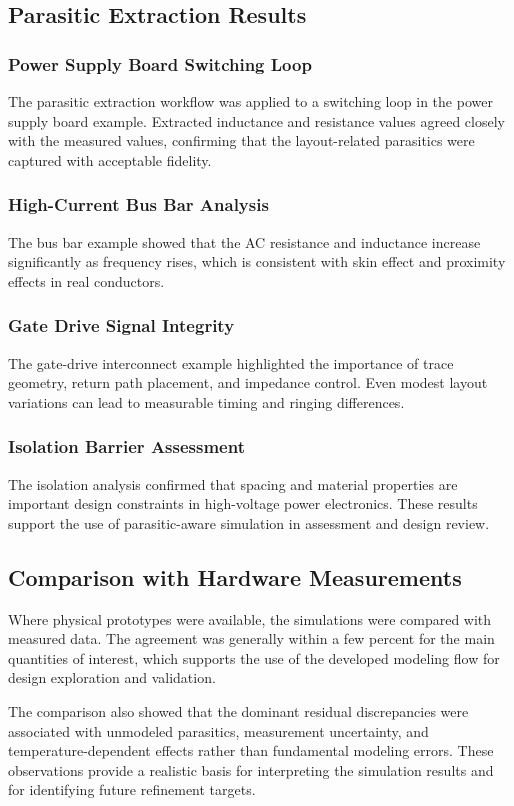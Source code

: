 \subsection{Parasitic Extraction Results}
\subsubsection{Power Supply Board Switching Loop}
The parasitic extraction workflow was applied to a switching loop in the power supply board example. Extracted inductance and resistance values agreed closely with the measured values, confirming that the layout-related parasitics were captured with acceptable fidelity.

\subsubsection{High-Current Bus Bar Analysis}
The bus bar example showed that the AC resistance and inductance increase significantly as frequency rises, which is consistent with skin effect and proximity effects in real conductors.

\subsubsection{Gate Drive Signal Integrity}
The gate-drive interconnect example highlighted the importance of trace geometry, return path placement, and impedance control. Even modest layout variations can lead to measurable timing and ringing differences.

\subsubsection{Isolation Barrier Assessment}
The isolation analysis confirmed that spacing and material properties are important design constraints in high-voltage power electronics. These results support the use of parasitic-aware simulation in assessment and design review.

\subsection{Comparison with Hardware Measurements}
Where physical prototypes were available, the simulations were compared with measured data. The agreement was generally within a few percent for the main quantities of interest, which supports the use of the developed modeling flow for design exploration and validation.

The comparison also showed that the dominant residual discrepancies were associated with unmodeled parasitics, measurement uncertainty, and temperature-dependent effects rather than fundamental modeling errors. These observations provide a realistic basis for interpreting the simulation results and for identifying future refinement targets.
